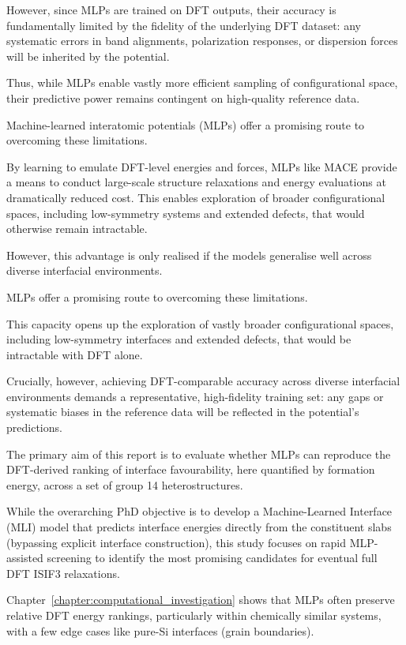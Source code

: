 However, since MLPs are trained on DFT outputs, their accuracy is fundamentally limited by the fidelity of the
underlying DFT dataset: any systematic errors in band alignments, polarization responses, or dispersion forces will be
inherited by the potential.

Thus, while MLPs enable vastly more efficient sampling of configurational space, their predictive power remains
contingent on high-quality reference data.

\label{para:mlp_overview} %

Machine-learned interatomic potentials (MLPs) offer a promising route to overcoming these limitations.

By learning to emulate DFT-level energies and forces, MLPs like MACE provide a means to conduct large-scale structure
relaxations and energy evaluations at dramatically reduced cost. This enables exploration of broader configurational
spaces, including low-symmetry systems and extended defects, that would otherwise remain intractable.

However, this advantage is only realised if the models generalise well across diverse interfacial environments.

MLPs offer a promising route to overcoming these limitations.

This capacity opens up the exploration of vastly broader configurational spaces, including low-symmetry interfaces and
extended defects, that would be intractable with DFT alone.

Crucially, however, achieving DFT-comparable accuracy across diverse interfacial environments demands a representative,
high-fidelity training set: any gaps or systematic biases in the reference data will be reflected in the potential's
predictions.


\label{para:motivation_mlp_dft} %

The primary aim of this report is to evaluate whether MLPs can reproduce the DFT-derived ranking of interface
favourability, here quantified by formation energy, across a set of group 14 heterostructures.

While the overarching PhD objective is to develop a Machine-Learned Interface (MLI) model that predicts interface
energies directly from the constituent slabs (bypassing explicit interface construction), this study focuses on rapid
MLP-assisted screening to identify the most promising candidates for eventual full DFT ISIF3 relaxations.

Chapter~\ref{chapter:computational_investigation} shows that MLPs often preserve relative DFT energy rankings,
particularly within chemically similar systems, with a few edge cases like pure-Si interfaces (grain boundaries).

